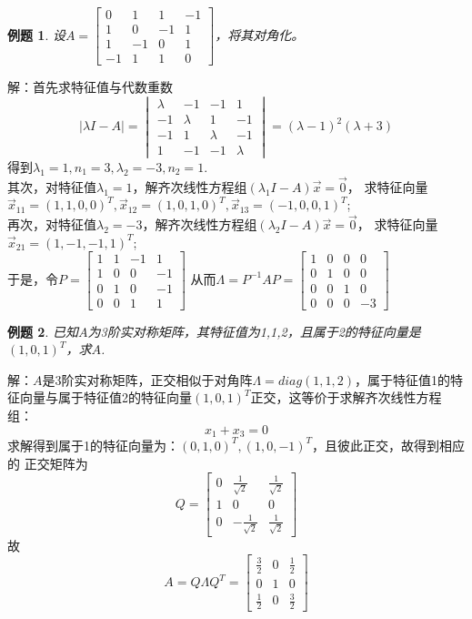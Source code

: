\documentclass[a4paper]{book}
\newtheorem{eg}{例题}[chapter]
\begin{document}
\begin{eg}
设$A=\begin{bmatrix}0&1&1&-1\\1&0&-1&1\\1&-1&0&1\\-1&1&1&0\end{bmatrix}$，将其对角化。
\end{eg}
解：首先求特征值与代数重数
\begin{equation*}
|\lambda I-A|=\begin{vmatrix}\lambda&-1&-1&1\\-1&\lambda&1&-1\\
-1&1&\lambda&-1\\1&-1&-1&\lambda\end{vmatrix}=(\lambda-1)^2(\lambda+3)
\end{equation*}
得到$\lambda_1=1,n_1=3,\lambda_2=-3,n_2=1$.\\
其次，对特征值$\lambda_1=1$，解齐次线性方程组$(\lambda_1 I-A)\vec{x}=\vec{0}$，
求特征向量$\vec{x}_{11}=(1,1,0,0)^T,\vec{x}_{12}=(1,0,1,0)^T,\vec{x}_{13}=(-1,0,0,1)^T$;\\
再次，对特征值$\lambda_2=-3$，解齐次线性方程组$(\lambda_2 I-A)\vec{x}=\vec{0}$，
求特征向量$\vec{x}_{21}=(1,-1,-1,1)^T$;\\
于是，令$P=\begin{bmatrix}1&1&-1&1\\1&0&0&-1\\0&1&0&-1\\0&0&1&1\end{bmatrix}$
从而$\Lambda=P^{-1}AP=
\begin{bmatrix}1&0&0&0\\0&1&0&0\\0&0&1&0\\0&0&0&-3\end{bmatrix}$

\begin{eg}
已知$A$为3阶实对称矩阵，其特征值为1,1,2，且属于2的特征向量是$(1,0,1)^T$，求$A$.
\end{eg}
解：$A$是3阶实对称矩阵，正交相似于对角阵$\Lambda=diag(1,1,2)$，属于特征值1的特征向量与属于特征值2的特征向量$(1,0,1)^T$正交，这等价于求解齐次线性方程组：
$$x_1+x_3=0$$
求解得到属于1的特征向量为：$(0,1,0)^T,(1,0,-1)^T$，且彼此正交，故得到相应的
正交矩阵为
$$Q=\begin{bmatrix}0&\frac{1}{\sqrt{2}}&\frac{1}{\sqrt{2}}\\1&0&0\\
0&-\frac{1}{\sqrt{2}}&\frac{1}{\sqrt{2}}\end{bmatrix}$$
故
$$A=Q\Lambda Q^T=\begin{bmatrix}\frac{3}{2}&0&\frac{1}{2}\\0&1&0\\
\frac{1}{2}&0&\frac{3}{2}\end{bmatrix}$$
\end{document}
